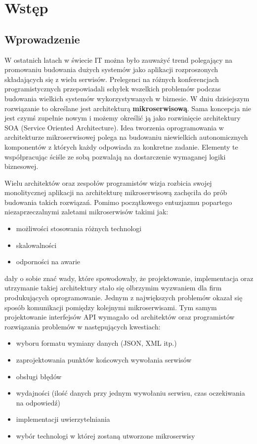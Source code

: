 \chapter{Wstęp}
\section{Wprowadzenie}
W ostatnich latach w świecie IT można było zauważyć trend polegający na promowaniu budowania dużych systemów jako aplikacji rozproszonych składających się z wielu serwisów. Prelegenci na różnych konferencjach programistycznych przepowiadali schyłek wszelkich problemów podczas budowania wielkich systemów wykorzystywanych w biznesie. W dniu dzisiejszym rozwiązanie to określane jest architekturą \textbf{mikroserwisową}. Sama koncepcja nie jest czymś zupełnie nowym i możemy określić ją jako rozwinięcie architektury SOA (Service Oriented Architecture). Idea tworzenia oprogramowania w architekturze mikroserwisowej polega na budowaniu niewielkich autonomicznych komponentów z których każdy odpowiada za konkretne zadanie. Elementy te współpracując ściśle ze sobą pozwalają na dostarczenie wymaganej logiki biznesowej. \par Wielu architektów oraz zespołów programistów wizja rozbicia swojej monolitycznej aplikacji na architekturę mikroserwisową zachęciła do prób budowania takich rozwiązań. Pomimo początkowego entuzjazmu popartego niezaprzeczalnymi zaletami mikroserwisów takimi jak:
\begin{itemize}
	\item możliwości stosowania różnych technologi
	\item skalowalności
	\item odporności na awarie
\end{itemize}
dały o sobie znać wady, które spowodowały, że projektowanie, implementacja oraz utrzymanie takiej architektury stało się olbrzymim wyzwaniem dla firm produkujących oprogramowanie. Jednym z największych problemów okazał się sposób komunikacji pomiędzy kolejnymi mikroserwisami. Tym samym projektowanie interfejsów API\cite{jacobson2015interfejs} wymagało od architektów oraz programistów rozwiązania problemów w następujących kwestiach:
\begin{itemize}
	\item wyboru formatu wymiany danych (JSON, XML itp.)
	\item zaprojektowania punktów końcowych wywołania serwisów
	\item obsługi błędów
	\item wydajności (ilość danych przy jednym wywołaniu serwisu, czas oczekiwania na odpowiedź)
	\item implementacji uwierzytelniania
	\item wybór technologi w której zostaną utworzone mikroserwisy
\end{itemize}
